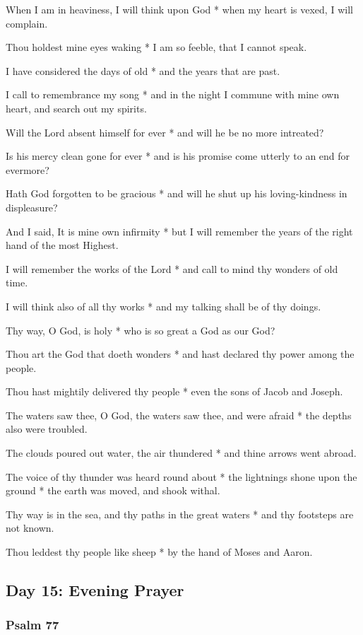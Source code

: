 When I am in heaviness, I will think upon God * when my heart is vexed, I will complain.

Thou holdest mine eyes waking * I am so feeble, that I cannot speak.

I have considered the days of old * and the years that are past.

I call to remembrance my song * and in the night I commune with mine own heart, and search out my spirits.

Will the Lord absent himself for ever * and will he be no more intreated?

Is his mercy clean gone for ever * and is his promise come utterly to an end for evermore?

Hath God forgotten to be gracious * and will he shut up his loving-kindness in displeasure?

And I said, It is mine own infirmity * but I will remember the years of the right hand of the most Highest.

I will remember the works of the Lord * and call to mind thy wonders of old time.

I will think also of all thy works * and my talking shall be of thy doings.

Thy way, O God, is holy * who is so great a God as our God?

Thou art the God that doeth wonders * and hast declared thy power among the people.

Thou hast mightily delivered thy people * even the sons of Jacob and Joseph.

The waters saw thee, O God, the waters saw thee, and were afraid * the depths also were troubled.

The clouds poured out water, the air thundered * and thine arrows went abroad.

The voice of thy thunder was heard round about * the lightnings shone upon the ground * the earth was moved, and shook withal.

Thy way is in the sea, and thy paths in the great waters * and thy footsteps are not known.

Thou leddest thy people like sheep * by the hand of Moses and Aaron.

\subsection{Day 15: Evening Prayer}

\subsubsection{Psalm 77}

